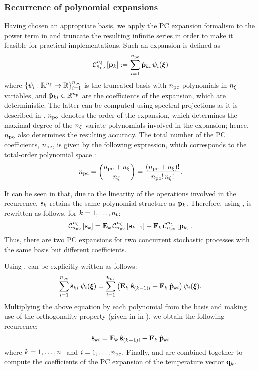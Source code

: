 \subsubsection{Recurrence of polynomial expansions} 
Having chosen an appropriate basis, we apply the PC expansion formalism to the power term in  and truncate the resulting infinite series in order to make it feasible for practical implementations.
Such an expansion is defined as
\begin{equation} \elabel{pc-expansion}
  \oPC{\nvars}{\pcorder}{\vP_k} := \sum_{i = 1}^{\pcterms} \pcc{\vP}_{ki} \, \pcb_i(\vZ)
\end{equation}
where $\{ \psi_i: \mathbb{R}^{n_\xi} \to \mathbb{R} \}_{i = 1}^{{n_\text{pc}}}$ is the truncated basis with ${n_\text{pc}}$ polynomials in ${n_\xi}$ variables, and $\hat{\mathbf{p}}_{ki} \in \mathbb{R}^{n_\text{p}}$ are the coefficients of the expansion, which are deterministic.
The latter can be computed using spectral projections as it is described in .
${n_\text{po}}$ denotes the order of the expansion, which determines the maximal degree of the ${n_\xi}$-variate polynomials involved in the expansion; hence, ${n_\text{po}}$ also determines the resulting accuracy.
The total number of the PC coefficients, ${n_\text{pc}}$, is given by the following expression, which corresponds to the total-order polynomial space \cite{eldred2008, beck2011}:
\begin{equation} \elabel{pc-terms}
  \pcterms = { \pcorder + \nvars \choose \nvars } = \frac{(\pcorder + \nvars)!}{\pcorder! \, \nvars!}.
\end{equation}

It can be seen in  that, due to the linearity of the operations involved in the recurrence, $\mathbf{s}_k$ retains the same polynomial structure as $\mathbf{p}_k$.
Therefore, using ,  is rewritten as follows, for $k = 1, \dotsc, {n_\text{t}}$:
\begin{equation} \elabel{expanded-recurrence}
  \oPC{\nvars}{\pcorder}{\vS_k} = \mCF_k \, \oPC{\nvars}{\pcorder}{\vS_{k-1}} + \mCS_k \, \oPC{\nvars}{\pcorder}{\vP_k}.
\end{equation}
Thus, there are two PC expansions for two concurrent stochastic processes with the same basis but different coefficients.

Using ,  can be explicitly written as follows:
\[
  \sum_{i = 1}^{\pcterms} \pcc{\vS}_{ki} \: \pcb_i(\vZ) = \sum_{i = 1}^{\pcterms} \left( \mCF_k \: \pcc{\vS}_{(k - 1)i} + \mCS_k \: \pcc{\vP}_{ki} \right) \pcb_i(\vZ).
\]
Multiplying the above equation by each polynomial from the basis and making use of the orthogonality property (given in  in ), we obtain the following recurrence:
\begin{equation} \elabel{pc-recurrence}
  \pcc{\vS}_{ki} = \mCF_k \: \pcc{\vS}_{(k - 1)i} + \mCS_k \: \pcc{\vP}_{ki}
\end{equation}
where $k = 1, \dotsc, {n_\text{t}}$ and $i = 1, \dotsc, {n_\text{pc}}$. Finally,  and  are combined together to compute the coefficients of the PC expansion of the temperature vector $\mathbf{q}_k$.

